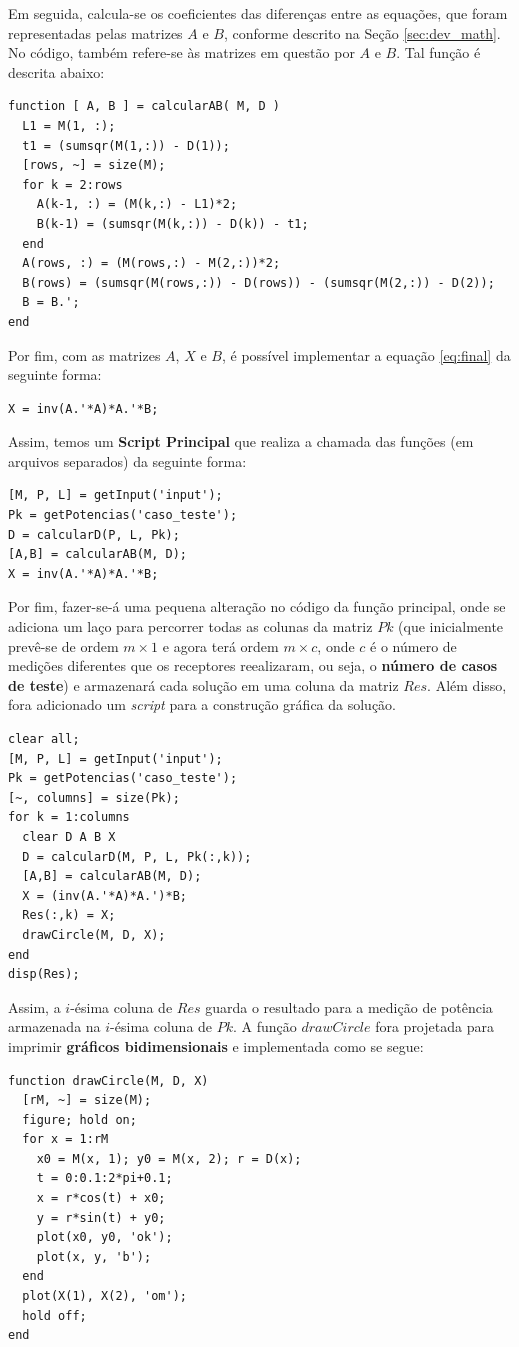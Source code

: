 	Em seguida, calcula-se os coeficientes das diferenças entre as equações, que foram representadas
	pelas matrizes $A$ e $B$, conforme descrito na Seção \ref{sec:dev_math}. No código, também refere-se às matrizes
	em questão por $A$ e $B$. Tal função é descrita abaixo:
	\begin{Verbatim}[fontsize=\footnotesize]
function [ A, B ] = calcularAB( M, D )
  L1 = M(1, :);
  t1 = (sumsqr(M(1,:)) - D(1));
  [rows, ~] = size(M);
  for k = 2:rows
    A(k-1, :) = (M(k,:) - L1)*2;
    B(k-1) = (sumsqr(M(k,:)) - D(k)) - t1;
  end
  A(rows, :) = (M(rows,:) - M(2,:))*2;
  B(rows) = (sumsqr(M(rows,:)) - D(rows)) - (sumsqr(M(2,:)) - D(2));
  B = B.';
end
	\end{Verbatim}

	Por fim, com as matrizes $A$, $X$ e $B$, é possível implementar a equação \ref{eq:final} da seguinte
	forma:
	\begin{Verbatim}[fontsize=\footnotesize]
X = inv(A.'*A)*A.'*B;
	\end{Verbatim}

	Assim, temos um \textbf{Script Principal} que realiza a chamada das funções (em arquivos separados) da seguinte
	forma:
	\begin{Verbatim}[fontsize=\footnotesize]
[M, P, L] = getInput('input');
Pk = getPotencias('caso_teste');
D = calcularD(P, L, Pk);
[A,B] = calcularAB(M, D);
X = inv(A.'*A)*A.'*B;
	\end{Verbatim}

	Por fim, fazer-se-á uma pequena alteração no código da função principal, onde se adiciona um laço para percorrer
	todas as colunas da matriz $Pk$ (que inicialmente prevê-se de ordem $m\times1$ e agora terá ordem $m\times c$, onde
	$c$ é o número de medições diferentes que os receptores reealizaram, ou seja, o \textbf{número de casos de teste}) e
	armazenará cada solução em uma coluna da matriz $Res$. Além disso, fora adicionado um \textit{script} para a construção
	gráfica da solução.
	\begin{Verbatim}[fontsize=\footnotesize]
clear all;
[M, P, L] = getInput('input');
Pk = getPotencias('caso_teste');
[~, columns] = size(Pk);
for k = 1:columns
  clear D A B X
  D = calcularD(M, P, L, Pk(:,k));
  [A,B] = calcularAB(M, D);
  X = (inv(A.'*A)*A.')*B;
  Res(:,k) = X;
  drawCircle(M, D, X);
end
disp(Res);
	\end{Verbatim}
	Assim, a $i$-ésima coluna de $Res$ guarda o resultado para a medição de potência armazenada na $i$-ésima coluna de $Pk$.
	A função $drawCircle$ fora projetada para imprimir \textbf{gráficos bidimensionais} e implementada como se segue:
	\begin{Verbatim}[fontsize=\footnotesize]
function drawCircle(M, D, X)
  [rM, ~] = size(M);
  figure; hold on;
  for x = 1:rM
    x0 = M(x, 1); y0 = M(x, 2); r = D(x);
    t = 0:0.1:2*pi+0.1;
    x = r*cos(t) + x0;
    y = r*sin(t) + y0;
    plot(x0, y0, 'ok');
    plot(x, y, 'b');
  end
  plot(X(1), X(2), 'om');
  hold off;
end
	\end{Verbatim}

